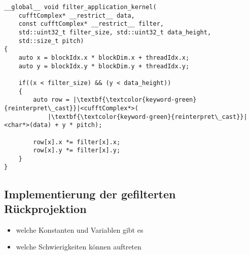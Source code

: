 \begin{code}
\begin{verbatim}
__global__ void filter_application_kernel(
    cufftComplex* __restrict__ data,
    const cufftComplex* __restrict__ filter,
    std::uint32_t filter_size, std::uint32_t data_height,
    std::size_t pitch)
{
    auto x = blockIdx.x * blockDim.x + threadIdx.x;
    auto y = blockIdx.y * blockDim.y + threadIdx.y;

    if((x < filter_size) && (y < data_height))
    {
        auto row = |\textbf{\textcolor{keyword-green}{reinterpret\_cast}}|<cufftComplex*>(
            |\textbf{\textcolor{keyword-green}{reinterpret\_cast}}|<char*>(data) + y * pitch);

        row[x].x *= filter[x].x;
        row[x].y *= filter[x].y;
    }
}
\end{verbatim}
\label{source:impl_filter}
\end{code}

\subsection{Implementierung der gefilterten Rückprojektion}

\begin{itemize}
    \item welche Konstanten und Variablen gibt es
    \item welche Schwierigkeiten können auftreten
\end{itemize}


